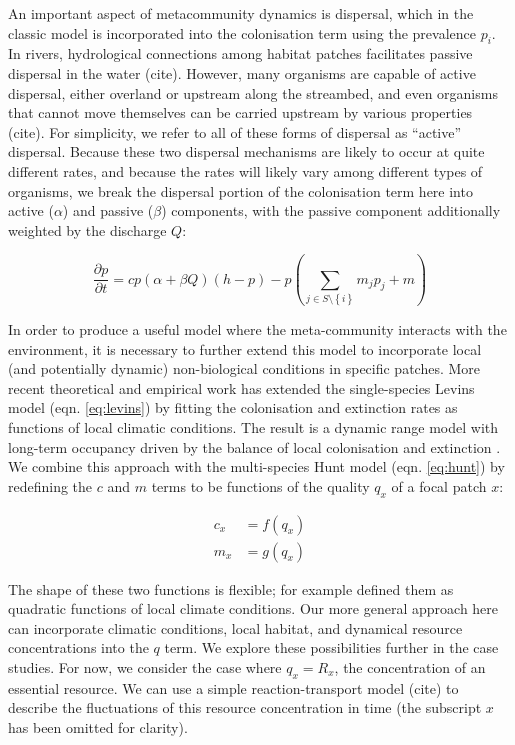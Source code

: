 \documentclass[11pt,a4paper]{article}
\begin{document}
An important aspect of metacommunity dynamics is dispersal, which in the classic model is incorporated into the colonisation term using the prevalence $p_i$.
In rivers, hydrological connections among habitat patches facilitates passive dispersal in the water (cite).
However, many organisms are capable of active dispersal, either overland or upstream along the streambed, and even organisms that cannot move themselves can be carried upstream by various properties (cite).
For simplicity, we refer to all of these forms of dispersal as “active” dispersal.
Because these two dispersal mechanisms are likely to occur at quite different rates, and because the rates will likely vary among different types of organisms, we break the dispersal portion of the colonisation term here into active ($\alpha$) and passive ($\beta$) components, with the passive component additionally weighted by the discharge $Q$:

\begin{equation}
	\frac{\partial p}{\partial t} = c p(\alpha + \beta Q) \left( h-p \right) - p \left( \sum_{j \in S \setminus \left\{i \right\} }{m_{j}p_j} + m \right)
	\label{eq:metacom}
\end{equation}

In order to produce a useful model where the meta-community interacts with the environment, it is necessary to further extend this model to incorporate local (and potentially dynamic) non-biological conditions in specific patches.
More recent theoretical \autocite{Holt2000,Holt2005} and empirical \autocite{Talluto2017} work has extended the single-species Levins model (eqn. \ref{eq:levins}) by fitting the colonisation and extinction rates as functions of local climatic conditions.
The result is a dynamic range model with long-term occupancy driven by the balance of local colonisation and extinction \autocite{Talluto2017}.
We combine this approach with the multi-species Hunt model (eqn. \ref{eq:hunt}) by redefining the $c$ and $m$ terms to be functions of the quality $q_x$ of a focal patch $x$:

\begin{equation}
\begin{split}
	c_{x} &= f(q_{x}) \label{eq:talluto} \\
	m_{x} &= g(q_{x})
\end{split}
\end{equation}


The shape of these two functions is flexible; for example \textcite{Talluto2017} defined them as quadratic functions of local climate conditions.
Our more general approach here can incorporate climatic conditions, local habitat, and dynamical resource concentrations into the $q$ term.
We explore these possibilities further in the case studies.
For now, we consider the case where $q_x = R_x$, the concentration of an essential resource.
We can use a simple reaction-transport model (cite) to describe the fluctuations of this resource concentration in time (the subscript $x$ has been omitted for clarity).
\end{document}
